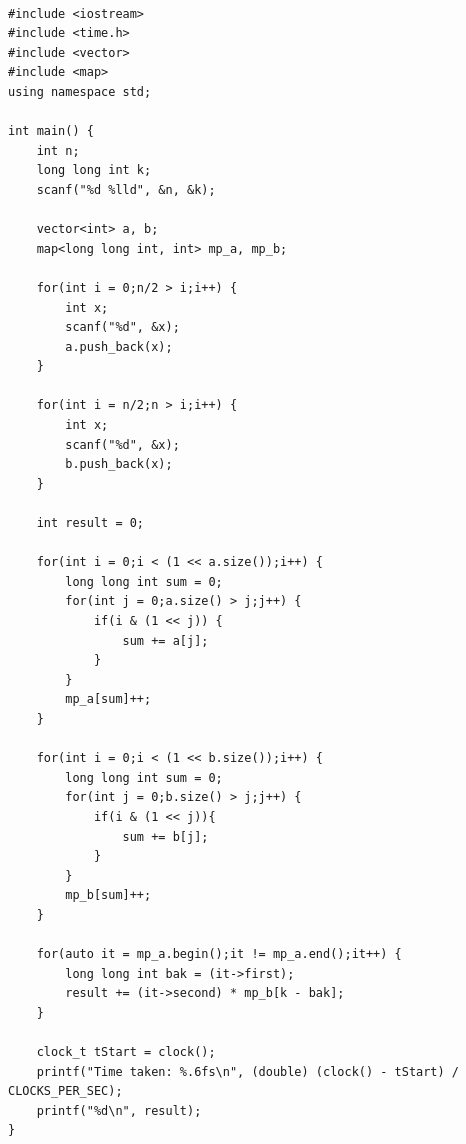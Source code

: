 \documentclass[12pt]{article}
\begin{document}
\begin{verbatim}
  
#include <iostream>
#include <time.h>
#include <vector>
#include <map>
using namespace std;

int main() {
    int n;
    long long int k;   
    scanf("%d %lld", &n, &k); 

    vector<int> a, b;
    map<long long int, int> mp_a, mp_b; 

    for(int i = 0;n/2 > i;i++) { 
        int x;  
        scanf("%d", &x);    
        a.push_back(x);
    }

    for(int i = n/2;n > i;i++) {
        int x;  
        scanf("%d", &x);    
        b.push_back(x);
    }

    int result = 0;

    for(int i = 0;i < (1 << a.size());i++) {
        long long int sum = 0;
        for(int j = 0;a.size() > j;j++) {
            if(i & (1 << j)) {
                sum += a[j];
            }
        }
        mp_a[sum]++;
    }

    for(int i = 0;i < (1 << b.size());i++) {
        long long int sum = 0;
        for(int j = 0;b.size() > j;j++) {
            if(i & (1 << j)){
                sum += b[j];
            }
        }
        mp_b[sum]++;
    }

    for(auto it = mp_a.begin();it != mp_a.end();it++) {
        long long int bak = (it->first);
        result += (it->second) * mp_b[k - bak];
    }

    clock_t tStart = clock();
    printf("Time taken: %.6fs\n", (double) (clock() - tStart) / CLOCKS_PER_SEC);
    printf("%d\n", result);
}
\end{verbatim}
\clearpage
\end{document}
